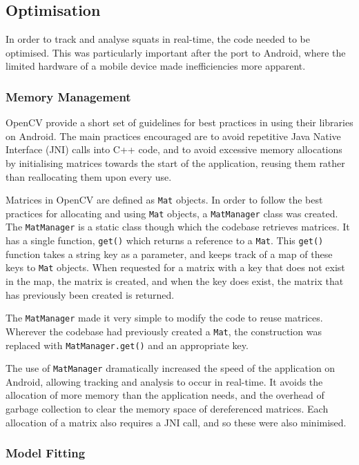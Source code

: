\subsection{Optimisation}

In order to track and analyse squats in real-time, the code needed to be optimised. This was particularly important after the port to Android, where the limited hardware of a mobile device made inefficiencies more apparent.

\subsubsection{Memory Management}

OpenCV provide a short set of guidelines for best practices in using their libraries on Android\cite{opencvoptim}. The main practices encouraged are to avoid repetitive Java Native Interface (JNI) calls into C++ code, and to avoid excessive memory allocations by initialising matrices towards the start of the application, reusing them rather than reallocating them upon every use.

Matrices in OpenCV are defined as \texttt{Mat} objects. In order to follow the best practices for allocating and using \texttt{Mat} objects, a \texttt{MatManager} class was created. The \texttt{MatManager} is a static class though which the codebase retrieves matrices. It has a single function, \texttt{get()} which returns a reference to a \texttt{Mat}. This \texttt{get()} function takes a string key as a parameter, and keeps track of a map of these keys to \texttt{Mat} objects. When requested for a matrix with a key that does not exist in the map, the matrix is created, and when the key does exist, the matrix that has previously been created is returned.

The \texttt{MatManager} made it very simple to modify the code to reuse matrices. Wherever the codebase had previously created a \texttt{Mat}, the construction was replaced with \texttt{MatManager.get()} and an appropriate key.

The use of \texttt{MatManager} dramatically increased the speed of the application on Android, allowing tracking and analysis to occur in real-time. It avoids the allocation of more memory than the application needs, and the overhead of garbage collection to clear the memory space of dereferenced matrices. Each allocation of a matrix also requires a JNI call, and so these were also minimised.

\subsubsection{Model Fitting}

